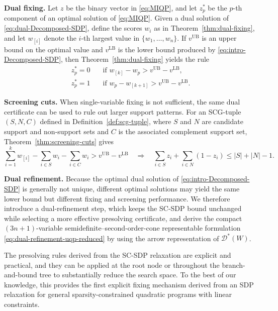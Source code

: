 \documentclass[11pt]{article}
\def\D{\mathcal{D}}
\def\tb#1{\textbf{#1}}
\theoremstyle{plain}
\begin{document}
\medskip
\noindent\tb{Dual fixing.}
Let $z$ be the binary vector in \eqref{eq:MIQP}, and let $z_p^*$ be the $p$-th component of an optimal solution of \eqref{eq:MIQP}. Given a dual solution of \eqref{eq:dual-Decomposed-SDP}, define the scores $w_i$ as in Theorem~\ref{thm:dual-fixing}, and let $w_{[i]}$ denote the $i$-th largest value in $\{w_1,\dots,w_n\}$. If $v^{\mathrm{UB}}$ is an upper bound on the optimal value and $v^{\mathrm{LB}}$ is the lower bound produced by \eqref{eq:intro-Decomposed-SDP}, then Theorem~\ref{thm:dual-fixing} yields the rule
\[
\begin{aligned}
z_p^*=0
&\quad\text{if }w_{[k]}-w_p>v^{\mathrm{UB}}-v^{\mathrm{LB}},\\
z_p^*=1
&\quad\text{if }w_p-w_{[k+1]}>v^{\mathrm{UB}}-v^{\mathrm{LB}}.
\end{aligned}
\]

\medskip
\noindent\tb{Screening cuts.}
When single-variable fixing is not sufficient, the same dual certificate can be used to rule out larger support patterns. For an SCG-tuple $(S,N,C)$ defined in Definition~\ref{def:scg-tuple}, where $S$ and $N$ are candidate support and non-support sets and $C$ is the associated complement support set, Theorem~\ref{thm:screening-cuts} gives
\begin{equation*}
\sum_{i=1}^k w_{[i]}-\sum_{i\in S}w_i-\sum_{i\in C}w_i
>v^{\mathrm{UB}}-v^{\mathrm{LB}}
\quad \Longrightarrow\quad
\sum_{i\in S} z_i+\sum_{i\in N}(1-z_i)
\le |S|+|N|-1.
\end{equation*}

\medskip
\noindent\tb{Dual refinement.}
Because the optimal dual solution of \eqref{eq:intro-Decomposed-SDP} is generally not unique, different optimal solutions may yield the same lower bound but different fixing and screening performance. We therefore introduce a dual-refinement step, which keeps the SC-SDP bound unchanged while selecting a more effective presolving certificate, and derive the compact $(3n+1)$-variable semidefinite--second-order-cone representable formulation \eqref{eq:dual-refinement-uqp-reduced} by using the arrow representation of $\D^*(W)$.

\medskip

The presolving rules derived from the SC-SDP relaxation are explicit and practical, and they can be applied at the root node or throughout the branch-and-bound tree to substantially reduce the search space. To the best of our knowledge, this provides the first explicit fixing mechanism derived from an SDP relaxation for general sparsity-constrained quadratic programs with linear constraints.
\end{document}
